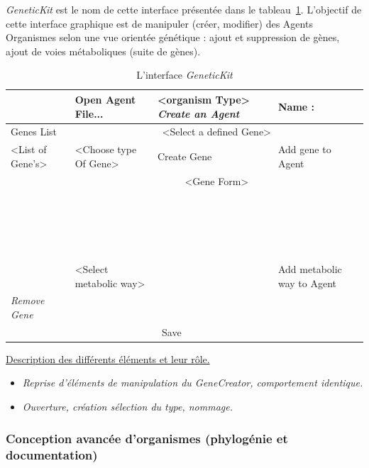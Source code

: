 \documentclass[11pt,twoside,a4paper]{article}
\begin{document}
\emph{GeneticKit} est le nom de cette interface pr{\'e}sent{\'e}e dans le tableau~\ref{tab:GeneticKit}. L'objectif de cette interface graphique est de manipuler (cr{\'e}er, modifier) des Agents Organismes selon une vue orient{\'e}e g{\'e}n{\'e}tique : ajout et suppression de g{\`e}nes, ajout de voies m{\'e}taboliques (suite de g{\`e}nes). 
\begin{table}[h]
	\centering
	\begin{scriptsize}
	\begin{tabular}{|l|l|l|l|}
	\hline
				& Open Agent File...	& <organism Type> \emph{Create an Agent} & Name : 	      \\
	\hline
	Genes List		& \multicolumn{3}{|c|}{<Select a defined Gene>}					      \\
				\cline{2-4}
	<List of Gene's>	& <Choose type Of Gene>		& Create Gene			 & Add gene to Agent  \\
				\cline{2-4}
				& \multicolumn{3}{|c|}{<Gene Form>} 							      \\
				& \multicolumn{3}{|c|}{~} 							      \\
				& \multicolumn{3}{|c|}{~} 							      \\
				& \multicolumn{3}{|c|}{~} 							      \\
				& \multicolumn{3}{|c|}{~} 							      \\
				\cline{2-4}
				& <Select metabolic way>	& 		& Add metabolic way to Agent	     \\
				\cline{2-3}
	\hline
	\emph{Remove Gene}	& \multicolumn{2}{|c|}{~}					& 		      \\
	\hline
				& \multicolumn{2}{|c|}{Save}					& 		      \\
	\hline
	\end{tabular}
	\caption[L'interface \emph{GeneticKit}]{L'interface \emph{GeneticKit}}
	\label{tab:GeneticKit}
	\end{scriptsize}
\end{table}

\underline{Description des diff{\'e}rents {\'e}l{\'e}ments et leur r{\^o}le. }
\begin{itemize}
	\item \emph{Reprise d'{\'e}l{\'e}ments de manipulation du \emph{GeneCreator}, comportement identique. }
	\item \emph{Ouverture, cr{\'e}ation s{\'e}lection du type, nommage. }
\end{itemize}


\subsubsection{Conception avanc{\'e}e d'organismes (phylog{\'e}nie et documentation)}
\end{document}

